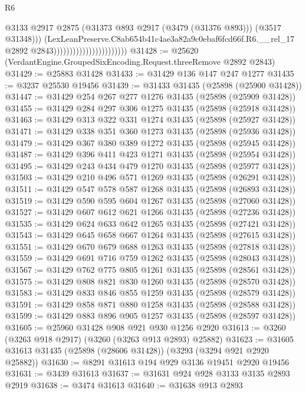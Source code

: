 \begin{lexlean}{R6}
\begin{coremodule}
                                                    @3133
                                                    @2917
                                                    @2875
                                                    (@31373 @893 @2917 (@3479 (@31376 @893)))
                                                    (@3517 @31348)))
                                                (LexLeanPreserve.C8ab654b41c4ae3a82a9c0ebaf6fcd66f.R6.__rel_17
                                                  @2892
                                                  @2843)))))))))))))))))))))))
@31428 := @25620 (VerdantEngine.GroupedSixEncoding.Request.threeRemove @2892 @2843)
@31429 := @25883 @31428
@31433 := @31429 @136 @147 @247 @1277
@31435 := @3237 @25530 @19456
@31439 := @31433 @31435 (@25898 (@25900 @31428))
@31447 := @31429 @254 @267 @277 @1276 @31435 (@25898 (@25909 @31428))
@31455 := @31429 @284 @297 @306 @1275 @31435 (@25898 (@25918 @31428))
@31463 := @31429 @313 @322 @331 @1274 @31435 (@25898 (@25927 @31428))
@31471 := @31429 @338 @351 @360 @1273 @31435 (@25898 (@25936 @31428))
@31479 := @31429 @367 @380 @389 @1272 @31435 (@25898 (@25945 @31428))
@31487 := @31429 @396 @411 @423 @1271 @31435 (@25898 (@25954 @31428))
@31495 := @31429 @243 @434 @479 @1270 @31435 (@25898 (@25977 @31428))
@31503 := @31429 @210 @496 @571 @1269 @31435 (@25898 (@26291 @31428))
@31511 := @31429 @547 @578 @587 @1268 @31435 (@25898 (@26893 @31428))
@31519 := @31429 @590 @595 @604 @1267 @31435 (@25898 (@27060 @31428))
@31527 := @31429 @607 @612 @621 @1266 @31435 (@25898 (@27236 @31428))
@31535 := @31429 @624 @633 @642 @1265 @31435 (@25898 (@27421 @31428))
@31543 := @31429 @645 @658 @667 @1264 @31435 (@25898 (@27615 @31428))
@31551 := @31429 @670 @679 @688 @1263 @31435 (@25898 (@27818 @31428))
@31559 := @31429 @691 @716 @759 @1262 @31435 (@25898 (@28043 @31428))
@31567 := @31429 @762 @775 @805 @1261 @31435 (@25898 (@28561 @31428))
@31575 := @31429 @808 @821 @830 @1260 @31435 (@25898 (@28570 @31428))
@31583 := @31429 @833 @846 @855 @1259 @31435 (@25898 (@28579 @31428))
@31591 := @31429 @858 @871 @880 @1258 @31435 (@25898 (@28588 @31428))
@31599 := @31429 @883 @896 @905 @1257 @31435 (@25898 (@28597 @31428))
@31605 := @25960 @31428 @908 @921 @930 @1256 @2920
@31613 := @3260 (@3263 @918 @2917) (@3260 (@3263 @913 @2893) @25882)
@31623 := @31605 @31613 @31435 (@25898 (@28606 @31428)) (@3293 (@3294 @921 @2920 @25882))
@31630 := @8291 @31613 @194 @929 @3136 @19451 @2920 @19456
@31631 := @3439 @31613
@31637 := @31631 @924 @928 @3133 @3135 @2893 @2919
@31638 := @3474 @31613
@31640 := @31638 @913 @2893

\end{coremodule}
\end{lexlean}
